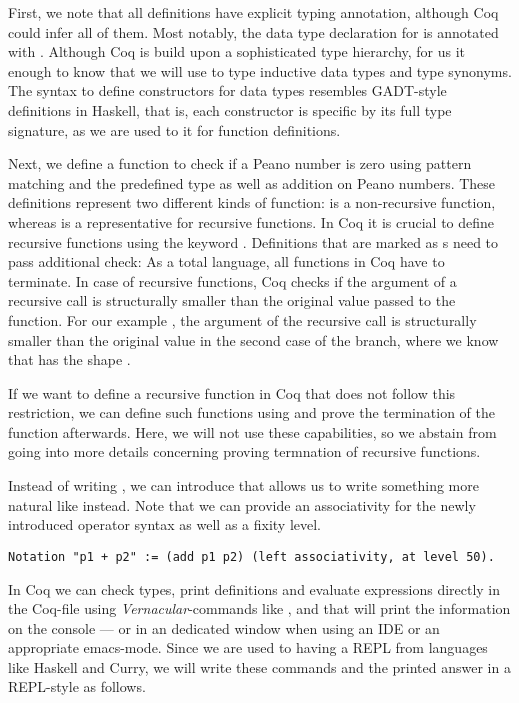 First, we note that all definitions have explicit typing annotation, although Coq could infer all of them.
Most notably, the data type declaration for  is annotated with .
Although Coq is build upon a sophisticated type hierarchy, for us it enough to know that we will use  to type inductive data types and type synonyms.
The syntax to define constructors for data types resembles GADT-style definitions in Haskell, that is, each constructor is specific by its full type signature, as we are used to it for function definitions.

Next, we define a function to check if a Peano number is zero using pattern matching and the predefined  type as well as addition on Peano numbers.
These definitions represent two different kinds of function:  is a non-recursive function, whereas  is a representative for recursive functions.
In Coq it is crucial to define recursive functions using the keyword .
Definitions that are marked as s need to pass additional check: As a total language, all functions in Coq have to terminate.
In case of recursive functions, Coq checks if the argument of a recursive call is structurally smaller than the original value passed to the function.
For our example , the argument of the recursive call  is structurally smaller than the original value  in the second case of the branch, where we know that  has the shape .

If we want to define a recursive function in Coq that does not follow this restriction, we can define such functions  using and prove the termination of the function afterwards.
Here, we will not use these capabilities, so we abstain from going into more details concerning proving termnation of recursive functions.

Instead of writing , we can introduce  that allows us to write something more natural like  instead.
Note that we can provide an associativity for the newly introduced operator syntax as well as a fixity level.

\begin{verbatim}
Notation "p1 + p2" := (add p1 p2) (left associativity, at level 50).
\end{verbatim}

In Coq we can check types, print definitions and evaluate expressions directly in the Coq-file using \emph{Vernacular}-commands like ,  and  that will print the information on the console --- or in an dedicated window when using an IDE or an appropriate emacs-mode.
Since we are used to having a REPL from languages like Haskell and Curry, we will write these commands and the printed answer in a REPL-style as follows.

